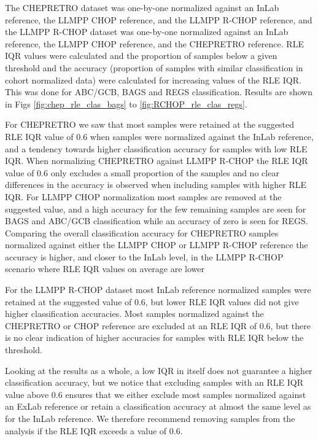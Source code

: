 \documentclass{article}
\begin{document}
The CHEPRETRO dataset was one-by-one normalized against an InLab reference, the LLMPP CHOP reference, and the LLMPP R-CHOP reference, and the LLMPP R-CHOP dataset was one-by-one normalized against an InLab reference, the LLMPP CHOP reference, and the CHEPRETRO reference. RLE IQR values were calculated and the proportion of samples below a given threshold and the accuracy (proportion of samples with similar classification in cohort normalized data) were calculated for increasing values of the RLE IQR. This was done for ABC/GCB, BAGS and REGS classification. Results are shown in Figs \ref{fig:chep_rle_clas_bags} to \ref{fig:RCHOP_rle_clas_regs}. 

For CHEPRETRO we saw that most samples were retained at the suggested RLE IQR value of 0.6 when samples were normalized against the InLab reference, and a tendency towards higher classification accuracy for samples with low RLE IQR. When normalizing CHEPRETRO against LLMPP R-CHOP the RLE IQR value of 0.6 only excludes a small proportion of the samples and no clear differences in the accuracy is observed when including samples with higher RLE IQR. For LLMPP CHOP normalization most samples are removed at the suggested value, and a high accuracy for the few remaining samples are seen for BAGS and ABC/GCB classification while an accuracy of zero is seen for REGS. Comparing the overall classification accuracy for CHEPRETRO samples normalized against either the LLMPP CHOP or LLMPP R-CHOP reference the accuracy is higher, and closer to the InLab level, in the LLMPP R-CHOP scenario where RLE IQR values on average are lower

For the LLMPP R-CHOP dataset most InLab reference normalized samples were retained at the suggested value of 0.6, but lower RLE IQR values did not give higher classification accuracies. Most samples normalized against the CHEPRETRO or CHOP reference are excluded at an RLE IQR of 0.6, but there is no clear indication of higher accuracies for samples with RLE IQR below the threshold.

Looking at the results as a whole, a low IQR in itself does not guarantee a higher classification accuracy, but we notice that excluding samples with an RLE IQR value above 0.6 ensures that we either exclude most samples normalized against an ExLab reference or retain a classification accuracy at almost the same level as for the InLab reference. We therefore recommend removing samples from the analysis if the RLE IQR exceeds a value of 0.6.
\end{document}
